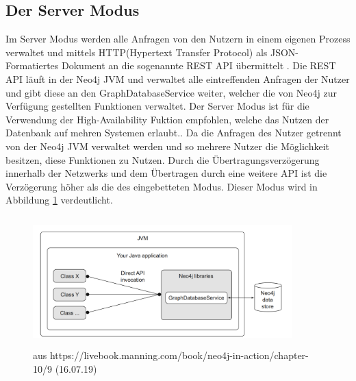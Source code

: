 \subsection{Der Server Modus} \label{Server}
Im Server Modus werden alle Anfragen von den Nutzern in einem eigenen Prozess verwaltet und mittels HTTP(Hypertext Transfer Protocol) als JSON-Formatiertes Dokument an die sogenannte REST API übermittelt \parencite{robinson2013graph}. Die REST API läuft in der Neo4j JVM und  verwaltet alle eintreffenden Anfragen der Nutzer und gibt diese an den GraphDatabaseService weiter, welcher die von Neo4j zur Verfügung gestellten Funktionen verwaltet. \newline 
Der Server Modus ist für die Verwendung der High-Availability Fuktion empfohlen, welche das Nutzen der Datenbank auf mehren Systemen erlaubt.\parencite{raj2015neo4j}. Da die Anfragen des Nutzer getrennt von der Neo4j JVM verwaltet werden und so mehrere Nutzer die Möglichkeit besitzen, diese Funktionen zu Nutzen. Durch die  Übertragungsverzögerung innerhalb der Netzwerks und dem Übertragen durch eine weitere API ist die Verzögerung höher als die des eingebetteten Modus. Dieser Modus wird in Abbildung \ref{fig:Server} verdeutlicht.
\begin{figure}[!htb]
	\centering
	\includegraphics [width=10cm, height=5cm]{Figures/server}
	\caption[Server Modus]{aus https://livebook.manning.com/book/neo4j-in-action/chapter-10/9 (16.07.19)}
	\label{fig:Server}
\end{figure}

